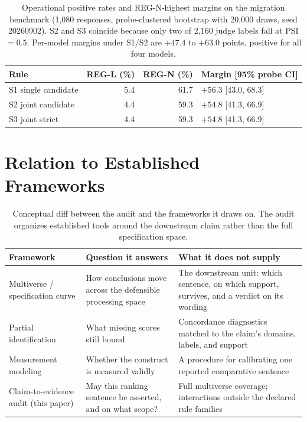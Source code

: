 \documentclass[11pt]{article}
\begin{document}
\begin{table}[H]
\centering
\scriptsize
\setlength{\tabcolsep}{4pt}
\begin{tabular}{@{}lrrl@{}}
\toprule
Rule & REG-L (\%) & REG-N (\%) & Margin [95\% probe CI] \\
\midrule
S1 single candidate & 5.4 & 61.7 & $+56.3$ [43.0, 68.3] \\
S2 joint candidate & 4.4 & 59.3 & $+54.8$ [41.3, 66.9] \\
S3 joint strict & 4.4 & 59.3 & $+54.8$ [41.3, 66.9] \\
\bottomrule
\end{tabular}
\caption{Operational positive rates and REG-N-highest margins on the migration benchmark (1{,}080 responses, probe-clustered bootstrap with 20{,}000 draws, seed 20260902). S2 and S3 coincide because only two of 2{,}160 judge labels fall at PSI$=0.5$. Per-model margins under S1/S2 are $+47.4$ to $+63.0$ points, positive for all four models.}
\end{table}

\section{Relation to Established Frameworks}
\label{app:frameworks}

\begin{table}[H]
\centering
\scriptsize
\setlength{\tabcolsep}{2pt}
\begin{tabular}{@{}p{2.45cm}p{2.5cm}p{2.45cm}@{}}
\toprule
Framework & Question it answers & What it does not supply \\
\midrule
Multiverse / specification curve \citep{steegen-2016-multiverse,simonsohn-2020-speccurve} & How conclusions move across the defensible processing space & The downstream unit: which sentence, on which support, survives, and a verdict on its wording \\
Partial identification \citep{manski-1989-selection} & What missing scores still bound & Concordance diagnostics matched to the claim's domains, labels, and support \\
Measurement modeling \citep{cronbach-meehl-1955,jacobs-wallach-2021-measurement} & Whether the construct is measured validly & A procedure for calibrating one reported comparative sentence \\
Claim-to-evidence audit (this paper) & May this ranking sentence be asserted, and on what scope? & Full multiverse coverage; interactions outside the declared rule families \\
\bottomrule
\end{tabular}
\caption{Conceptual diff between the audit and the frameworks it draws on. The audit organizes established tools around the downstream claim rather than the full specification space.}
\label{tab:frameworks}
\end{table}
\end{document}
